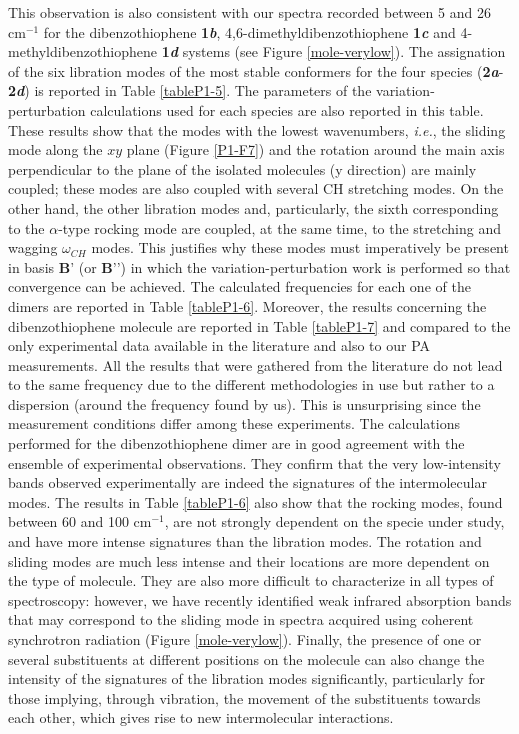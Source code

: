 		
		This observation is also consistent with our spectra recorded between 5 and 26 cm$^{-1}$ for the dibenzothiophene \textbf{1\textit{b}},  4,6-dimethyldibenzothiophene \textbf{1\textit{c}} and 4-methyldibenzothiophene \textbf{1\textit{d}} systems (see Figure \ref{mole-verylow}). The assignation of the six libration modes of the most stable conformers for the four species (\textbf{2\textit{a}}-\textbf{2\textit{d}}) is reported in Table \ref{tableP1-5}. The parameters of the variation-perturbation calculations used for each species are also reported in this table. These results show that the modes with the lowest wavenumbers, \textit{i.e.}, the sliding mode along the $xy$ plane (Figure \ref{P1-F7}) and the rotation around the main axis perpendicular to the plane of the isolated molecules (y direction) are mainly coupled; these modes are also coupled with several CH stretching modes. On the other hand, the other libration modes and, particularly, the sixth corresponding to the $\alpha$-type rocking mode are coupled, at the same time, to the stretching and wagging $\omega_{CH}$ modes. This justifies why these modes must imperatively be present in basis $\textbf{B’}$ (or $\textbf{B’’}$) in which the variation-perturbation work is performed so that convergence can be achieved. The calculated frequencies for each one of the dimers are reported in Table \ref{tableP1-6}. Moreover, the results concerning the dibenzothiophene molecule are reported in Table \ref{tableP1-7} and compared to the only experimental data available in the literature and also to our PA measurements. All the results that were gathered from the literature do not lead to the same frequency due to the different methodologies in use but rather to a dispersion (around the frequency found by us). This is unsurprising since the measurement conditions differ among these experiments. The calculations performed for the dibenzothiophene dimer are in good agreement with the ensemble of experimental observations. They confirm that the very low-intensity bands observed experimentally are indeed the signatures of the intermolecular modes. The results in Table \ref{tableP1-6} also show that the rocking modes, found between 60 and 100 cm$^{-1}$, are not strongly dependent on the specie under study, and have more intense signatures than the libration modes. The rotation and sliding modes are much less intense and their locations are more dependent on the type of molecule. They are also more difficult to characterize in all types of spectroscopy: however, we have recently identified weak infrared absorption bands that may correspond to the sliding mode in spectra acquired using coherent synchrotron radiation (Figure \ref{mole-verylow}). Finally, the presence of one or several substituents at different positions on the molecule can also change the intensity of the signatures of the libration modes significantly, particularly for those implying, through vibration, the movement of the substituents towards each other, which gives rise to new intermolecular interactions.\\
		
